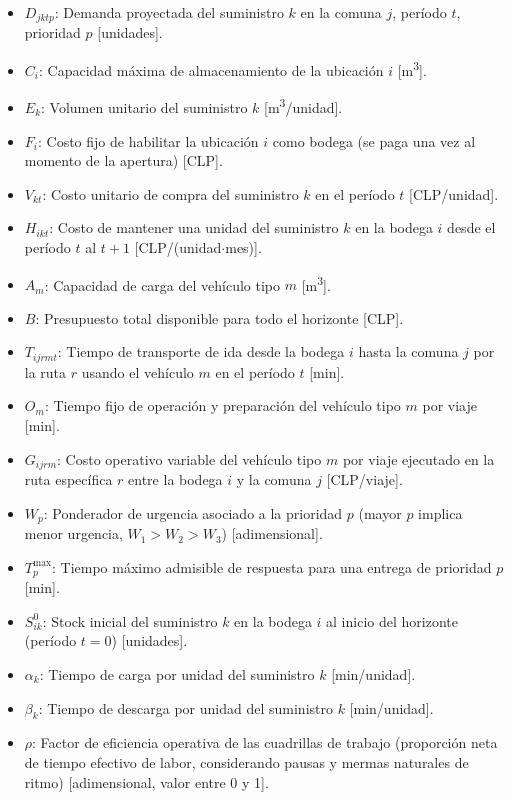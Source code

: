 \documentclass[letterpaper]{article}
\begin{document}
\begin{flushleft}
\begin{itemize}[leftmargin=2em, itemsep=1pt]
  \item $D_{jktp}$: Demanda proyectada del suministro $k$ en la comuna $j$, per\'iodo $t$, prioridad $p$ [unidades].
  \item $C_i$: Capacidad m\'axima de almacenamiento de la ubicaci\'on $i$ [m\textsuperscript{3}].
  \item $E_k$: Volumen unitario del suministro $k$ [m\textsuperscript{3}/unidad].
  \item $F_i$: Costo fijo de habilitar la ubicaci\'on $i$ como bodega (se paga una vez al momento de la apertura) [CLP].
  \item $V_{kt}$: Costo unitario de compra del suministro $k$ en el per\'iodo $t$ [CLP/unidad].
  \item $H_{ikt}$: Costo de mantener una unidad del suministro $k$ en la bodega $i$ desde el per\'iodo $t$ al $t+1$ [CLP/(unidad$\cdot$mes)].
  \item $A_m$: Capacidad de carga del veh\'iculo tipo $m$ [m\textsuperscript{3}].
  \item $B$: Presupuesto total disponible para todo el horizonte [CLP].
  \item $T_{ijrmt}$: Tiempo de transporte de ida desde la bodega $i$ hasta la comuna $j$ por la ruta $r$ usando el veh\'iculo $m$ en el per\'iodo $t$ [min].
  \item $O_m$: Tiempo fijo de operaci\'on y preparaci\'on del veh\'iculo tipo $m$ por viaje [min].
  \item $G_{ijrm}$: Costo operativo variable del veh\'iculo tipo $m$ por viaje ejecutado en la ruta espec\'ifica $r$ entre la bodega $i$ y la comuna $j$ [CLP/viaje].
  \item $W_p$: Ponderador de urgencia asociado a la prioridad $p$ (mayor $p$ implica menor urgencia, $W_1 > W_2 > W_3$) [adimensional].
  \item $T^{\max}_p$: Tiempo m\'aximo admisible de respuesta para una entrega de prioridad $p$ [min].
  \item $S^0_{ik}$: Stock inicial del suministro $k$ en la bodega $i$ al inicio del horizonte (per\'iodo $t=0$) [unidades].
  \item $\alpha_k$: Tiempo de carga por unidad del suministro $k$ [min/unidad].
  \item $\beta_k$: Tiempo de descarga por unidad del suministro $k$ [min/unidad].
  \item $\rho$: Factor de eficiencia operativa de las cuadrillas de trabajo (proporci\'on neta de tiempo efectivo de labor, considerando pausas y mermas naturales de ritmo) [adimensional, valor entre 0 y 1].

\end{itemize}
\end{flushleft}
\end{document}
